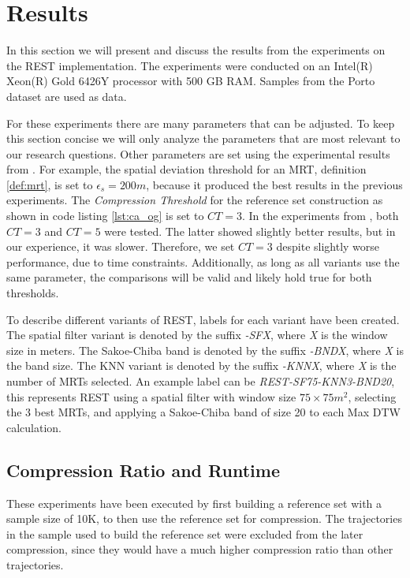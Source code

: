 \chapter{Results}
\label{chap:res}
In this section we will present and discuss the results from the experiments on the REST implementation. The experiments were conducted on an Intel(R) Xeon(R) Gold 6426Y processor with 500 GB RAM. Samples from the Porto dataset are used as data.

For these experiments there are many parameters that can be adjusted. To keep this section concise we will only analyze the parameters that are most relevant to our research questions. Other parameters are set using the experimental results from \textcite{zhao2018rest}. For example, the spatial deviation threshold for an MRT, definition \ref{def:mrt}, is set to $\epsilon_s = 200 m$, because it produced the best results in the previous experiments. The \textit{Compression Threshold} for the reference set construction as shown in code listing \ref{lst:ca_og} is set to $CT = 3$. In the experiments from \textcite{zhao2018rest}, both $CT =3$ and $CT = 5$ were tested. The latter showed slightly better results, but in our experience, it was slower. Therefore, we set $CT = 3$ despite slightly worse performance, due to time constraints. Additionally, as long as all variants use the same parameter, the comparisons will be valid and likely hold true for both thresholds.

To describe different variants of REST, labels for each variant have been created. The spatial filter variant is denoted by the suffix \textit{-SFX}, where \textit{X} is the window size in meters. The Sakoe-Chiba band is denoted by the suffix \textit{-BNDX}, where \textit{X} is the band size. The KNN variant is denoted by the suffix \textit{-KNNX}, where \textit{X} is the number of MRTs selected. An example label can be \textit{REST-SF75-KNN3-BND20}, this represents REST using a spatial filter with window size $75\times75 m^2$, selecting the 3 best MRTs, and applying a Sakoe-Chiba band of size 20 to each Max DTW calculation.

\section{Compression Ratio and Runtime}
These experiments have been executed by first building a reference set with a sample size of 10K, to then use the reference set for compression. The trajectories in the sample used to build the reference set were excluded from the later compression, since they would have a much higher compression ratio than other trajectories.

